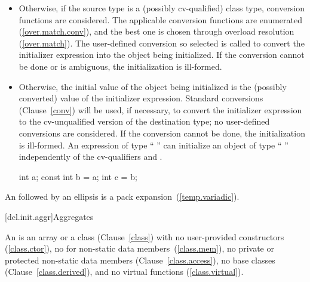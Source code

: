 \begin{itemize}
\item
Otherwise, if the source type
is a (possibly cv-qualified) class type, conversion functions are
considered.
The applicable conversion functions are enumerated
(\ref{over.match.conv}), and the best one is chosen through overload
resolution (\ref{over.match}).
The user-defined conversion so selected
is called to convert the initializer expression into the
object being initialized.
If the conversion cannot be done or is
ambiguous, the initialization is ill-formed.
\item
Otherwise, the initial value of the object being initialized is
the (possibly converted) value of the initializer expression.
Standard conversions (Clause~\ref{conv}) will be used, if necessary,
to convert the initializer expression to the cv-unqualified version of
the destination type;
no user-defined conversions are considered.
If the conversion cannot
be done, the initialization is ill-formed.
%
\enternote
An expression of type
`` ''
can initialize an object of type
`` ''
independently of
the cv-qualifiers
and .

\begin{codeblock}
int a;
const int b = a;
int c = b;
\end{codeblock}
\exitnote
\end{itemize}

\pnum
An  followed by an ellipsis is a
pack expansion~(\ref{temp.variadic}).

[dcl.init.aggr]{Aggregates}%
%
%
%
%
%
%

\pnum
An
is an array or a class (Clause~\ref{class}) with no
user-provided constructors (\ref{class.ctor}),
no  for non-static data
members~(\ref{class.mem}),
no private or protected non-static data members (Clause~\ref{class.access}),
no base classes (Clause~\ref{class.derived}),
and no virtual functions (\ref{class.virtual}).


